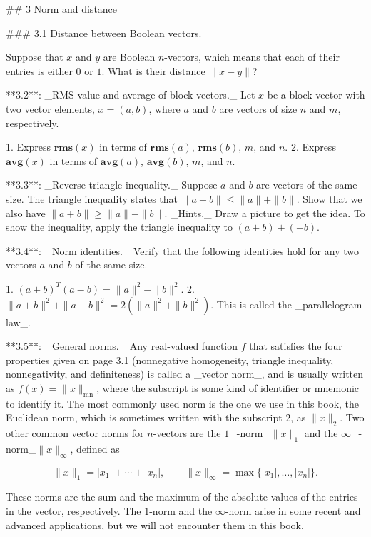 

## 3 Norm and distance

### 3.1 Distance between Boolean vectors.

Suppose that \(x\) and \(y\) are Boolean \(n\)-vectors, which means that each of their entries is either \(0\) or \(1\). What is their distance \(\|x-y\|\)?

**3.2**: _RMS value and average of block vectors._ Let \(x\) be a block vector with two vector elements, \(x=(a,b)\), where \(a\) and \(b\) are vectors of size \(n\) and \(m\), respectively.

1. Express \(\mathbf{rms}(x)\) in terms of \(\mathbf{rms}(a)\), \(\mathbf{rms}(b)\), \(m\), and \(n\).
2. Express \(\mathbf{avg}(x)\) in terms of \(\mathbf{avg}(a)\), \(\mathbf{avg}(b)\), \(m\), and \(n\).

**3.3**: _Reverse triangle inequality._ Suppose \(a\) and \(b\) are vectors of the same size. The triangle inequality states that \(\|a+b\|\leq\|a\|+\|b\|\). Show that we also have \(\|a+b\|\geq\|a\|-\|b\|\). _Hints._ Draw a picture to get the idea. To show the inequality, apply the triangle inequality to \((a+b)+(-b)\).

**3.4**: _Norm identities._ Verify that the following identities hold for any two vectors \(a\) and \(b\) of the same size.

1. \((a+b)^{T}(a-b)=\|a\|^{2}-\|b\|^{2}\).
2. \(\|a+b\|^{2}+\|a-b\|^{2}=2(\|a\|^{2}+\|b\|^{2})\). This is called the _parallelogram law_.

**3.5**: _General norms._ Any real-valued function \(f\) that satisfies the four properties given on page 3.1 (nonnegative homogeneity, triangle inequality, nonnegativity, and definiteness) is called a _vector norm_, and is usually written as \(f(x)=\|x\|_{\mathrm{mn}}\), where the subscript is some kind of identifier or mnemonic to identify it. The most commonly used norm is the one we use in this book, the Euclidean norm, which is sometimes written with the subscript \(2\), as \(\|x\|_{2}\). Two other common vector norms for \(n\)-vectors are the \(1\)_-norm_\(\|x\|_{1}\) and the \(\infty\)_-norm_\(\|x\|_{\infty}\), defined as

\[\|x\|_{1}=|x_{1}|+\cdots+|x_{n}|,\qquad\|x\|_{\infty}=\max\{|x_{1}|,\ldots,|x_ {n}|\}.\]

These norms are the sum and the maximum of the absolute values of the entries in the vector, respectively. The \(1\)-norm and the \(\infty\)-norm arise in some recent and advanced applications, but we will not encounter them in this book.

